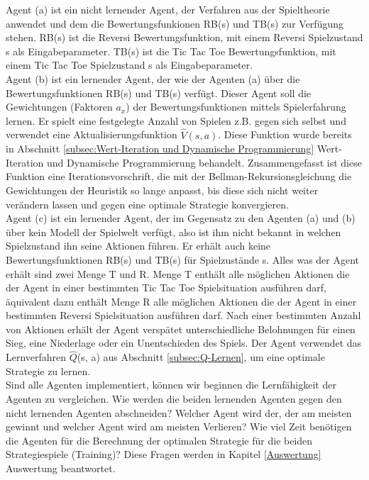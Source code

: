 Agent (a) ist ein nicht lernender Agent, der Verfahren aus der Spieltheorie anwendet und dem die Bewertungsfunkionen RB(s) und TB(s) zur Verfügung stehen. RB(s) ist die Reversi Bewertungsfunktion, mit einem Reversi Spielzustand s als Eingabeparameter. TB(s) ist die Tic Tac Toe Bewertungsfunktion, mit einem Tic Tac Toe Spielzustand s als Eingabeparameter. \\

Agent (b) ist ein lernender Agent, der wie der Agenten (a) über die Bewertungsfunktionen RB(s) und TB(s) verfügt. Dieser Agent soll die Gewichtungen (Faktoren $a_x$) der Bewertungsfunktionen mittels Spielerfahrung lernen. Er spielt eine festgelegte Anzahl von Spielen z.B. gegen sich selbst und verwendet eine Aktualisierungsfunktion $\hat{V}(s,a)$. Diese Funktion wurde bereits in Abschnitt \ref{subsec:Wert-Iteration und Dynamische Programmierung} Wert-Iteration und Dynamische Programmierung behandelt. Zusammengefasst ist diese Funktion eine Iterationsvorschrift, die mit der Bellman-Rekursionsgleichung die Gewichtungen der Heuristik so lange anpasst, bis diese sich nicht weiter verändern lassen und gegen eine optimale Strategie konvergieren. \\

Agent (c) ist ein lernender Agent, der im Gegensatz zu den Agenten (a) und (b) über kein Modell der Spielwelt verfügt, also ist ihm nicht bekannt in welchen Spielzustand ihn seine Aktionen führen. Er erhält auch keine Bewertungsfunktionen RB(s) und TB(s) für Spielzustände s. Alles was der Agent erhält sind zwei Menge T und R. Menge T enthält alle möglichen Aktionen die der Agent in einer bestimmten Tic Tac Toe Spielsituation ausführen darf, äquivalent dazu enthält Menge R alle möglichen Aktionen die der Agent in einer bestimmten Reversi Spielsituation ausführen darf. Nach einer bestimmten Anzahl von Aktionen erhält der Agent verspätet unterschiedliche Belohnungen für einen Sieg, eine Niederlage oder ein Unentschieden des Spiels. Der Agent verwendet das Lernverfahren $\hat{Q}$(s, a) aus Abschnitt  \ref{subsec:Q-Lernen}, um eine optimale Strategie zu lernen. \\

Sind alle Agenten implementiert, können wir beginnen die Lernfähigkeit der Agenten zu vergleichen. Wie werden die beiden lernenden Agenten gegen den nicht lernenden Agenten abschneiden? Welcher Agent wird der, der am meisten gewinnt und welcher Agent wird am meisten Verlieren? Wie viel Zeit benötigen die Agenten für die Berechnung der optimalen Strategie für die beiden Strategiespiele (Training)? Diese Fragen werden in Kapitel \ref{Auswertung} Auswertung beantwortet.


